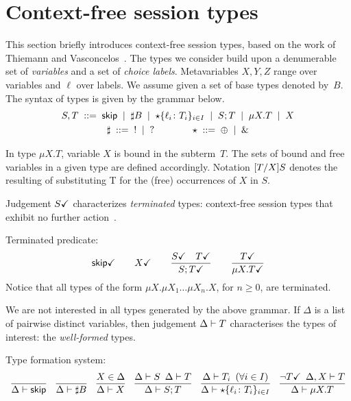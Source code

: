 \section{Context-free session types}
\label{sec:contextfreesession}

This section briefly introduces context-free session types, based on
the work of Thiemann and Vasconcelos~\cite{thiemann2016context}.
%
The types we consider build upon a denumerable set of \emph{variables}
and a set of \emph{choice labels}.  Metavariables $X,Y,Z$ range over
variables and $\ell$ over labels.
%
We assume given a set of base types denoted by~$B$.
The syntax of types is given by the grammar below.
%
\begin{gather*}
  S,T \grmeq \skipk \grmor \sharp B \grmor 
  \star\{\ell_i\colon T_i\}_{i\in I} \grmor S;T \grmor \mu X.T \grmor X
  \\
  \sharp \grmeq {}! \grmor {}? 
  \qquad \qquad
  \star  \grmeq \oplus \grmor {}\&
\end{gather*}

In type $\mu X.T$, variable $X$ is bound in the subterm~$T$. The sets
of bound and free variables in a given type are defined
accordingly. Notation $\subs{T}{X}S$ denotes the resulting of
substituting T for the (free) occurrences of $X$ in $S$.

Judgement $\DONE S$ characterizes \emph{terminated} types:
context-free session types that exhibit no further
action~\cite{DBLP:journals/jacm/AcetoH92}.

\noindent Terminated predicate:\hfill{} 
%
\begin{gather*}
  \DONE{\skipk}
  \qquad 
  \DONE X
  \qquad
  \frac{\DONE{S} \quad \DONE{T}}{\DONE{S; T}}
  \qquad
  \frac{\DONE T}{\DONE{\mu X.T}}
\end{gather*}
%
Notice that all types of the form $\mu X. \mu X_1\dots\mu X_n.X$, for
$n\ge0$, are terminated.

We are not interested in all types generated by the above grammar.
%
If $\Delta$ is a list of pairwise distinct variables, then judgement
$\isType T$ characterises the types of interest: the
\emph{well-formed} types.

\noindent Type formation system: \hfill{}
%
\begin{gather*}
  \frac{} 
  {
    \isType \skipk
  }
  \enspace\;
  \frac{}
  {
    \isType {\sharp B}
  }
  \enspace\;
  \frac{
    X \in \Delta
  }{
    \isType{X}
  }
  \enspace\;
  \frac{
    \isType{S}
    \enspace
    \isType{T}
  }{
    \isType{S;T}
  }
  \enspace\;
  \frac{
    \isType{T_i}
    \enspace
    (\forall i\in I)
  }{
    \isType{\star 
      \{ \ell_i \colon T_i\}_{i\in I}}
  }
  \enspace\;
  \frac{
    \neg\DONE T
    \enspace 
    \isType [\Delta, X] T
  }{
    \isType {\mu X. T}
  }
\end{gather*}

